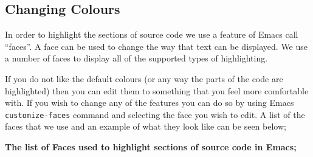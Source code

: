 \documentclass{report}
\begin{document}
\newpage


\subsection{Changing Colours}

In order to highlight the sections of source code we use a feature of
Emacs call ``faces''. A face can be used to change the way that text
can be displayed. We use a number of faces to display all of the
supported types of highlighting.

If you do not like the default colours (or any way the parts of the
code are highlighted) then you can edit them to something that you
feel more comfortable with. If you wish to change any of the features
you can do so by using Emacs \texttt{customize-faces} command and
selecting the face you wish to edit. A list of the faces that we use
and an example of what they look like can be seen below;

\medskip

\textbf{The list of Faces used to highlight sections of source code in
  Emacs;}
\end{document}
